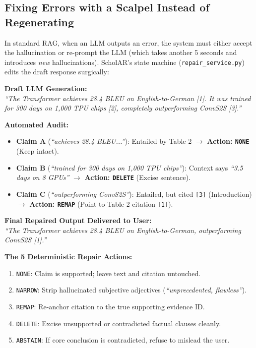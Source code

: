 \documentclass[11pt,a4paper]{article}
\begin{document}
\subsection{Fixing Errors with a Scalpel Instead of Regenerating}
In standard RAG, when an LLM outputs an error, the system must either accept the hallucination or re-prompt the LLM (which takes another 5 seconds and introduces \textit{new} hallucinations). ScholAR's state machine (\texttt{repair\_service.py}) edits the draft response surgically:

\vspace{0.5em}
\textbf{Draft LLM Generation:}\\
\textit{``The Transformer achieves 28.4 BLEU on English-to-German [1]. It was trained for 300 days on 1,000 TPU chips [2], completely outperforming ConvS2S [3].''}

\vspace{0.5em}
\textbf{Automated Audit:}\\
\begin{itemize}[noitemsep]
    \item \textbf{Claim A} (\textit{``achieves 28.4 BLEU...''}): Entailed by Table 2 $\to$ \textbf{Action: \texttt{NONE}} (Keep intact).
    \item \textbf{Claim B} (\textit{``trained for 300 days on 1,000 TPU chips''}): Context says \textit{``3.5 days on 8 GPUs''} $\to$ \textbf{Action: \texttt{DELETE}} (Excise sentence).
    \item \textbf{Claim C} (\textit{``outperforming ConvS2S''}): Entailed, but cited \texttt{[3]} (Introduction) $\to$ \textbf{Action: \texttt{REMAP}} (Point to Table 2 citation \texttt{[1]}).
\end{itemize}

\vspace{0.5em}
\textbf{Final Repaired Output Delivered to User:}\\
\textit{``The Transformer achieves 28.4 BLEU on English-to-German, outperforming ConvS2S [1].''}

\vspace{0.5em}
\textbf{The 5 Deterministic Repair Actions:}
\begin{enumerate}[noitemsep]
    \item \texttt{NONE}: Claim is supported; leave text and citation untouched.
    \item \texttt{NARROW}: Strip hallucinated subjective adjectives (\textit{``unprecedented, flawless''}).
    \item \texttt{REMAP}: Re-anchor citation to the true supporting evidence ID.
    \item \texttt{DELETE}: Excise unsupported or contradicted factual clauses cleanly.
    \item \texttt{ABSTAIN}: If core conclusion is contradicted, refuse to mislead the user.
\end{enumerate}
\end{document}
